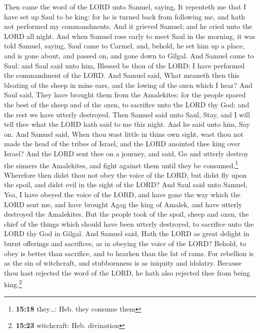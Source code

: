  Then came the word of the LORD unto Samuel, saying,
 It repenteth me that I have set up Saul to be king: for
he is turned back from following me, and hath not performed my
commandments. And it grieved Samuel; and he cried unto the LORD all
night.  And when Samuel rose early to meet Saul in the
morning, it was told Samuel, saying, Saul came to Carmel, and, behold,
he set him up a place, and is gone about, and passed on, and gone down
to Gilgal.  And Samuel came to Saul: and Saul said unto
him, Blessed be thou of the LORD: I have performed the commandment of
the LORD.  And Samuel said, What meaneth then this
bleating of the sheep in mine ears, and the lowing of the oxen which I
hear?  And Saul said, They have brought them from the
Amalekites: for the people spared the best of the sheep and of the oxen,
to sacrifice unto the LORD thy God; and the rest we have utterly
destroyed.  Then Samuel said unto Saul, Stay, and I will
tell thee what the LORD hath said to me this night. And he said unto
him, Say on.  And Samuel said, When thou wast little in
thine own sight, wast thou not made the head of the tribes of Israel,
and the LORD anointed thee king over Israel?  And the
LORD sent thee on a journey, and said, Go and utterly destroy the
sinners the Amalekites, and fight against them until they be
consumed.\footnote{\textbf{15:18} they\ldots: Heb. they consume them}
 Wherefore then didst thou not obey the voice of the
LORD, but didst fly upon the spoil, and didst evil in the sight of the
LORD?  And Saul said unto Samuel, Yea, I have obeyed the
voice of the LORD, and have gone the way which the LORD sent me, and
have brought Agag the king of Amalek, and have utterly destroyed the
Amalekites.  But the people took of the spoil, sheep and
oxen, the chief of the things which should have been utterly destroyed,
to sacrifice unto the LORD thy God in Gilgal.  And Samuel
said, Hath the LORD as great delight in burnt offerings and sacrifices,
as in obeying the voice of the LORD? Behold, to obey is better than
sacrifice, and to hearken than the fat of rams.  For
rebellion is as the sin of witchcraft, and stubbornness is as iniquity
and idolatry. Because thou hast rejected the word of the LORD, he hath
also rejected thee from being king.\footnote{\textbf{15:23} witchcraft:
  Heb. divination}

